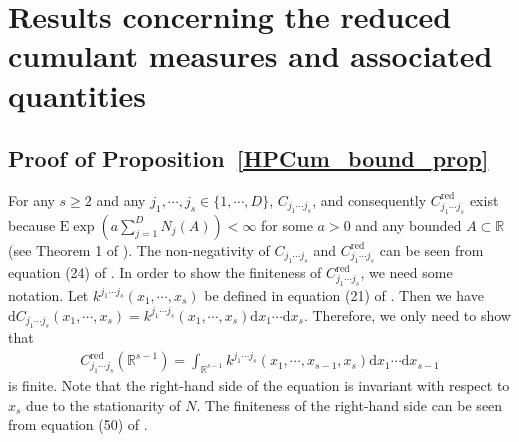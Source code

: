 \documentclass[11pt]{article}
\numberwithin{equation}{section}
\theoremstyle{plain}
\theoremstyle{definition}
\theoremstyle{definition}
\theoremstyle{assumption}
\theoremstyle{proposition}
\theoremstyle{proposition}
\theoremstyle{example}
\theoremstyle{lemma}
\theoremstyle{theorem}
\theoremstyle{remark}
\begin{document}
\section{Results concerning the reduced cumulant measures and associated quantities}

\subsection{Proof of Proposition~\ref{HPCum_bound_prop}}\label{cum_density_HP_sect}
For any $s\geqslant2$ and any $j_1,\cdots,j_s\in\{1,\cdots,D\}$, $C_{j_1\cdots j_s}$, and consequently $C_{j_1\cdots j_s}^{\mathrm{red}}$ exist because $\mathrm{E}\exp(a\sum_{j=1}^D N_j(A))<\infty$ for some $a>0$ and any bounded $A\subset\mathbb{R}$ (see Theorem 1 of \citet{Leblanc2024}). The non-negativity of $C_{j_1\cdots j_s}$ and $C_{j_1\cdots j_s}^{\mathrm{red}}$ can be seen from equation (24) of \citet{Jovanovic_et_al2015}. In order to show the finiteness of $C_{j_1\cdots j_s}^{\mathrm{red}}$, we need some notation. Let $k^{j_1\cdots j_s}(x_1,\cdots,x_s)$ be defined in equation (21) of \citet{Jovanovic_et_al2015}. Then we have $\mathrm{d}C_{j_1\cdots j_s}(x_1,\cdots,x_s) = k^{j_1\cdots j_s}(x_1,\cdots,x_s)\mathrm{d}x_1\cdots\mathrm{d}x_s$. Therefore, we only need to show that
\begin{align*}
C_{j_1\cdots j_s}^{\mathrm{red}}(\mathbb{R}^{s-1}) = \int_{\mathbb{R}^{s-1}}k^{j_1\cdots j_s}(x_1,\cdots,x_{s-1},x_s)\mathrm{d}x_1\cdots\mathrm{d}x_{s-1} 
\end{align*}
is finite. Note that the right-hand side of the equation is invariant with respect to $x_s$ due to the stationarity of $N$. The finiteness of the right-hand side can be seen from equation (50) of \citet{Jovanovic_et_al2015}.
\end{document}
